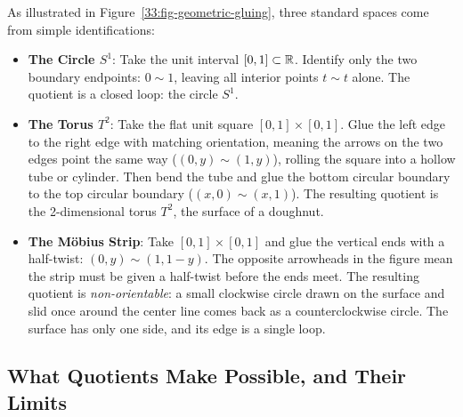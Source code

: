 As illustrated in Figure~\ref{33:fig-geometric-gluing}, three standard spaces come from simple identifications:
\begin{itemize}
  \item \textbf{The Circle $S^1$}: Take the unit interval $[0, 1] \subset \mathbb{R}$. Identify only the two boundary endpoints: $0 \sim 1$, leaving all interior points $t \sim t$ alone. The quotient is a closed loop: the circle $S^1$.
  \item \textbf{The Torus $T^2$}: Take the flat unit square $[0, 1] \times [0, 1]$. Glue the left edge to the right edge with matching orientation, meaning the arrows on the two edges point the same way ($(0, y) \sim (1, y)$), rolling the square into a hollow tube or cylinder. Then bend the tube and glue the bottom circular boundary to the top circular boundary ($(x, 0) \sim (x, 1)$). The resulting quotient is the 2-dimensional torus $T^2$, the surface of a doughnut.
  \item \textbf{The Möbius Strip}: Take $[0, 1] \times [0, 1]$ and glue the vertical ends with a half-twist: $(0, y) \sim (1, 1-y)$. The opposite arrowheads in the figure mean the strip must be given a half-twist before the ends meet. The resulting quotient is \emph{non-orientable}: a small clockwise circle drawn on the surface and slid once around the center line comes back as a counterclockwise circle. The surface has only one side, and its edge is a single loop.
\end{itemize}

\subsection{What Quotients Make Possible, and Their Limits}

